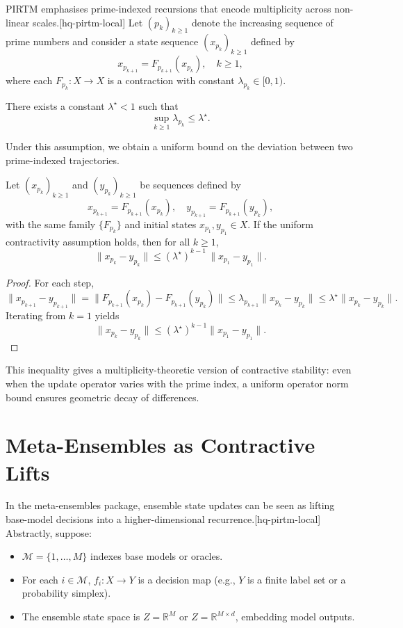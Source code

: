 \documentclass[11pt]{article}
\begin{document}
PIRTM emphasises prime-indexed recursions that encode multiplicity across non-linear scales.[hq-pirtm-local] Let \((p_k)_{k\geq 1}\) denote the increasing sequence of prime numbers and consider a state sequence \((x_{p_k})_{k\geq 1}\) defined by
\[
  x_{p_{k+1}} = F_{p_{k+1}}(x_{p_k}), \quad k \geq 1,
\]
where each \(F_{p_k}:X\to X\) is a contraction with constant \(\lambda_{p_k} \in [0,1)\).

\begin{assumption}
There exists a constant \(\lambda^\star < 1\) such that
\[
  \sup_{k \geq 1} \lambda_{p_k} \leq \lambda^\star.
\]
\end{assumption}

Under this assumption, we obtain a uniform bound on the deviation between two prime-indexed trajectories.

\begin{proposition}
Let \((x_{p_k})_{k\geq 1}\) and \((y_{p_k})_{k\geq 1}\) be sequences defined by
\[
  x_{p_{k+1}} = F_{p_{k+1}}(x_{p_k}), \quad
  y_{p_{k+1}} = F_{p_{k+1}}(y_{p_k}),
\]
with the same family \(\{F_{p_k}\}\) and initial states \(x_{p_1},y_{p_1} \in X\). If the uniform contractivity assumption holds, then for all \(k\geq 1\),
\[
  \|x_{p_k} - y_{p_k}\| \leq (\lambda^\star)^{k-1} \, \|x_{p_1} - y_{p_1}\|.
\]
\end{proposition}

\begin{proof}
For each step,
\[
  \|x_{p_{k+1}} - y_{p_{k+1}}\|
  = \|F_{p_{k+1}}(x_{p_k}) - F_{p_{k+1}}(y_{p_k})\|
  \leq \lambda_{p_{k+1}} \|x_{p_k} - y_{p_k}\|
  \leq \lambda^\star \|x_{p_k} - y_{p_k}\|.
\]
Iterating from \(k=1\) yields
\[
  \|x_{p_k} - y_{p_k}\| \leq (\lambda^\star)^{k-1} \|x_{p_1} - y_{p_1}\|.
\]
\end{proof}

This inequality gives a multiplicity-theoretic version of contractive stability: even when the update operator varies with the prime index, a uniform operator norm bound ensures geometric decay of differences.

\section{Meta-Ensembles as Contractive Lifts}

In the meta-ensembles package, ensemble state updates can be seen as lifting base-model decisions into a higher-dimensional recurrence.[hq-pirtm-local] Abstractly, suppose:
\begin{itemize}
  \item \(\mathcal{M} = \{1,\dots,M\}\) indexes base models or oracles.
  \item For each \(i \in \mathcal{M}\), \(f_i : X \to Y\) is a decision map (e.g., \(Y\) is a finite label set or a probability simplex).
  \item The ensemble state space is \(Z = \mathbb{R}^M\) or \(Z = \mathbb{R}^{M \times d}\), embedding model outputs.
\end{itemize}
\end{document}
